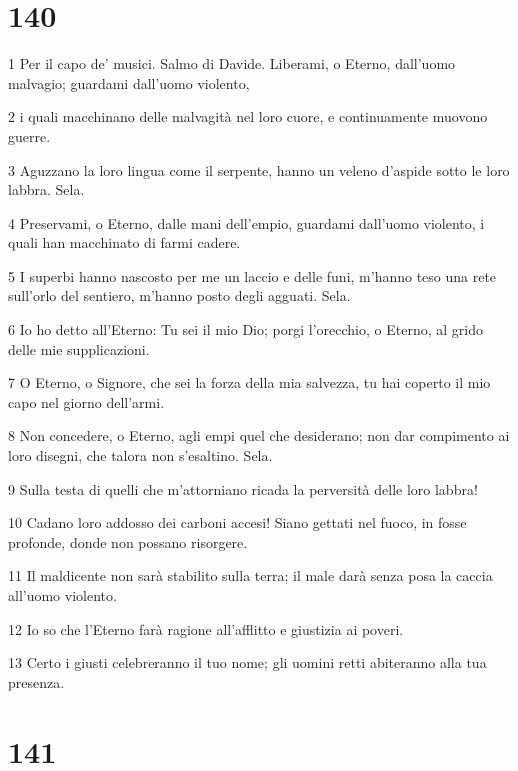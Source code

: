 \chapter{140}

\par 1 Per il capo de' musici. Salmo di Davide. Liberami, o Eterno, dall'uomo malvagio; guardami dall'uomo violento,
\par 2 i quali macchinano delle malvagità nel loro cuore, e continuamente muovono guerre.
\par 3 Aguzzano la loro lingua come il serpente, hanno un veleno d'aspide sotto le loro labbra. Sela.
\par 4 Preservami, o Eterno, dalle mani dell'empio, guardami dall'uomo violento, i quali han macchinato di farmi cadere.
\par 5 I superbi hanno nascosto per me un laccio e delle funi, m'hanno teso una rete sull'orlo del sentiero, m'hanno posto degli agguati. Sela.
\par 6 Io ho detto all'Eterno: Tu sei il mio Dio; porgi l'orecchio, o Eterno, al grido delle mie supplicazioni.
\par 7 O Eterno, o Signore, che sei la forza della mia salvezza, tu hai coperto il mio capo nel giorno dell'armi.
\par 8 Non concedere, o Eterno, agli empi quel che desiderano; non dar compimento ai loro disegni, che talora non s'esaltino. Sela.
\par 9 Sulla testa di quelli che m'attorniano ricada la perversità delle loro labbra!
\par 10 Cadano loro addosso dei carboni accesi! Siano gettati nel fuoco, in fosse profonde, donde non possano risorgere.
\par 11 Il maldicente non sarà stabilito sulla terra; il male darà senza posa la caccia all'uomo violento.
\par 12 Io so che l'Eterno farà ragione all'afflitto e giustizia ai poveri.
\par 13 Certo i giusti celebreranno il tuo nome; gli uomini retti abiteranno alla tua presenza.

\chapter{141}

